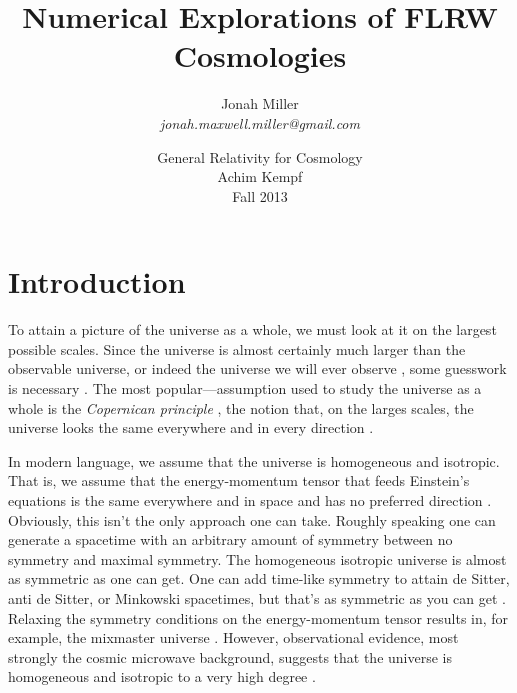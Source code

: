 \documentclass[]{article}
\title{Numerical Explorations of FLRW Cosmologies}
\author{Jonah Miller\\
  \textit{jonah.maxwell.miller@gmail.com}}
\date{General Relativity for Cosmology\\Achim Kempf\\ Fall 2013}
\begin{document}
\maketitle


\section{Introduction}
\label{sec:intro}

To attain a picture of the universe as a whole, we must look at it on
the largest possible scales. Since the universe is almost certainly
much larger than the observable universe, or indeed the universe we
will ever observe
\cite{MapOfUniverse,Carroll,MisnerThorneWheeler,Wald}, some guesswork
is necessary \cite{Wald}. The most popular---assumption
used to study the universe as a whole is the \textit{Copernican
  principle} \cite{BonesOfCopernicus}, the notion that, on the larges
scales, the universe looks the same everywhere and in every direction
\cite{Carroll,Wald}.

In modern language, we assume that the universe is homogeneous and
isotropic. That is, we assume that the energy-momentum tensor that
feeds Einstein's equations is the same everywhere and in space and has
no preferred direction
\cite{Carroll,MisnerThorneWheeler,Wald}. Obviously, this isn't the
only approach one can take. Roughly speaking one can generate a
spacetime with an arbitrary amount of symmetry between no symmetry and
maximal symmetry. The homogeneous isotropic universe is almost as
symmetric as one can get. One can add time-like symmetry to attain de
Sitter, anti de Sitter, or Minkowski spacetimes, but that's as
symmetric as you can get
\cite{Carroll,MisnerThorneWheeler,Wald}. Relaxing the symmetry
conditions on the energy-momentum tensor results in, for example, the
mixmaster universe \cite{MisnerThorneWheeler}. However, observational
evidence, most strongly the cosmic microwave background, suggests that
the universe is homogeneous and isotropic to a very high degree
\cite{Planck}.
\end{document}
